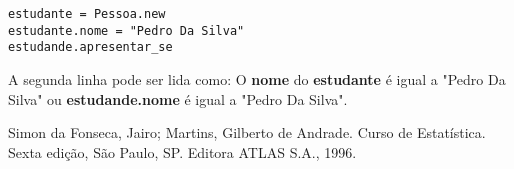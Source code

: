 \documentclass[12pt]{article}
\newcommand{\code}[1] {\textbf{#1}}
\begin{document}
\begin{lstlisting}[caption=Usando uma classe com métodos e atributos de acesso]
estudante = Pessoa.new
estudante.nome = "Pedro Da Silva"
estudande.apresentar_se
\end{lstlisting}

A segunda linha pode ser lida como: O \code{nome} do \code{estudante} é igual a "Pedro Da Silva" ou \code{estudande.nome} é igual a "Pedro Da Silva".



\begin{thebibliography}{9}

Simon da Fonseca, Jairo; Martins, Gilberto de Andrade.
Curso de Estatística.
Sexta edição, São Paulo, SP. Editora ATLAS S.A., 1996.
\end{thebibliography} 
\end{document}
